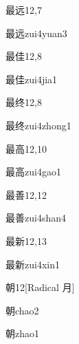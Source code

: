 \begin{entry}{最远}{12,7}
  \begin{phonetics}{最远}{zui4yuan3}
  \end{phonetics}
\end{entry}

\begin{entry}{最佳}{12,8}
  \begin{phonetics}{最佳}{zui4jia1}
  \end{phonetics}
\end{entry}

\begin{entry}{最终}{12,8}
  \begin{phonetics}{最终}{zui4zhong1}
  \end{phonetics}
\end{entry}

\begin{entry}{最高}{12,10}
  \begin{phonetics}{最高}{zui4gao1}
  \end{phonetics}
\end{entry}

\begin{entry}{最善}{12,12}
  \begin{phonetics}{最善}{zui4shan4}
  \end{phonetics}
\end{entry}

\begin{entry}{最新}{12,13}
  \begin{phonetics}{最新}{zui4xin1}
  \end{phonetics}
\end{entry}

\begin{entry}{朝}{12}[Radical 月]
  \begin{phonetics}{朝}{chao2}
  \end{phonetics}
  \begin{phonetics}{朝}{zhao1}
  \end{phonetics}
\end{entry}

